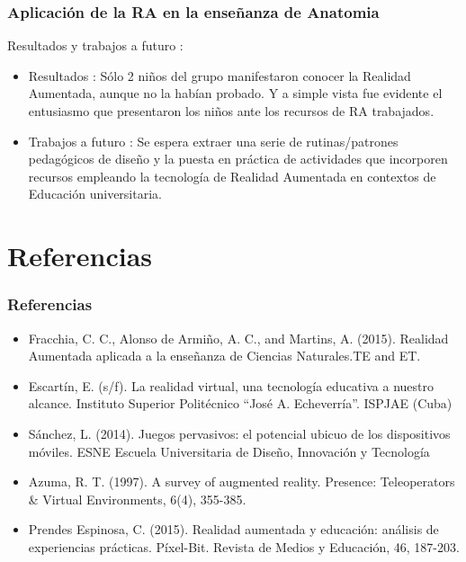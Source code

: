 \documentclass[11pt]{beamer}
\begin{document}
\begin{frame}
\frametitle{Aplicación de la RA en la enseñanza de Anatomia}
\center Resultados y trabajos a futuro : 
\begin{itemize}
\item Resultados : Sólo 2 niños del grupo manifestaron conocer la Realidad
Aumentada, aunque no la habían probado. Y a simple vista fue
evidente el entusiasmo que presentaron los niños ante los
recursos de RA trabajados.
\item Trabajos a futuro : Se espera extraer una serie de rutinas/patrones pedagógicos de diseño
y la puesta en práctica de actividades que incorporen
recursos empleando la tecnología de Realidad Aumentada
en contextos de Educación universitaria. 
\end{itemize}
\end{frame}




\section{Referencias}
\begin{frame}
\frametitle{Referencias}
\begin{itemize}
\item Fracchia, C. C., Alonso de Armiño, A. C., and Martins, A. (2015). Realidad Aumentada aplicada a la enseñanza de Ciencias Naturales.TE  and   ET.
\item Escartín, E. (s/f). La realidad virtual, una tecnología educativa a nuestro alcance. Instituto Superior Politécnico “José A. Echeverría”.
ISPJAE (Cuba)
\item Sánchez, L. (2014). Juegos pervasivos: el potencial ubicuo de los dispositivos móviles. ESNE Escuela Universitaria de Diseño, Innovación y Tecnología
\item Azuma, R. T. (1997). A survey of augmented reality. Presence: Teleoperators & Virtual Environments, 6(4), 355-385.
\item Prendes Espinosa, C. (2015). Realidad aumentada y educación: análisis de experiencias prácticas. Píxel-Bit. Revista de Medios y Educación, 46, 187-203.
\end{itemize}
\end{frame}
\end{document}
